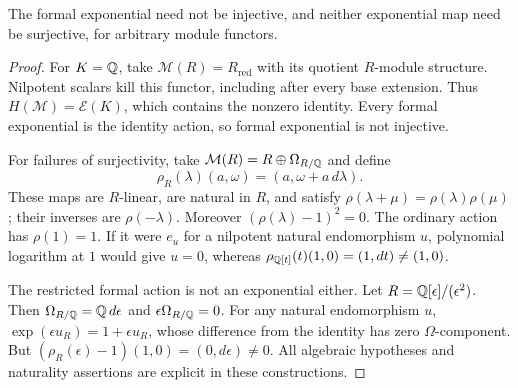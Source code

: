 \begin{proposition}\label{C-functor-counter}
The formal exponential need not be injective, and neither exponential
map need be surjective, for arbitrary module functors.
\end{proposition}
\begin{proof}
For $K={\mathbb{Q}}$, take $\mathcal M(R)=R_{\mathrm{red}}$ with its quotient
$R$-module structure. Nilpotent scalars kill this functor, including
after every base extension. Thus $H(\mathcal M)=\mathscr E(K)$, which
contains the nonzero identity. Every formal exponential is the identity
action, so formal exponential is not injective.

For failures of surjectivity, take
$\mathcal M(R)=R\oplus\Omega_{R/{\mathbb{Q}}}$ and define
\[
 \rho_R(\lambda)(a,\omega)=(a,\omega+a\,d\lambda).
\]
These maps are $R$-linear, are natural in $R$, and satisfy
$\rho(\lambda+\mu)=\rho(\lambda)\rho(\mu)$; their inverses are
$\rho(-\lambda)$. Moreover $(\rho(\lambda)-1)^2=0$.
The ordinary action has $\rho(1)=1$. If it were $e_u$ for a nilpotent
natural endomorphism $u$, polynomial logarithm at $1$ would give $u=0$,
whereas $\rho_{{\mathbb{Q}}[t]}(t)(1,0)=(1,dt)\ne(1,0)$.

The restricted formal action is not an exponential either. Let
$R={\mathbb{Q}}[\epsilon]/(\epsilon^2)$. Then
$\Omega_{R/{\mathbb{Q}}}={\mathbb{Q}}\,d\epsilon$ and
$\epsilon\Omega_{R/{\mathbb{Q}}}=0$. For any natural endomorphism $u$,
$\exp(\epsilon u_R)=1+\epsilon u_R$, whose difference from the identity
has zero $\Omega$-component. But
$(\rho_R(\epsilon)-1)(1,0)=(0,d\epsilon)\ne0$.
All algebraic hypotheses and naturality assertions are explicit in these
constructions.
\end{proof}

